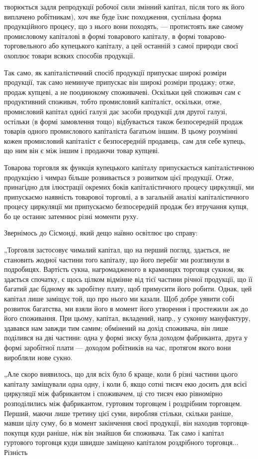 творюється задля репродукції робочої сили змінний капітал, після того як
його виплачено робітникам), хоч яке буде їхнє походження, суспільна
форма продукційного процесу, що з нього вони походять, — протистоять
вже самому промисловому капіталові в формі товарового капіталу, в формі
товарово-торговельного або купецького капіталу, а цей останній з самої
природи своєї охоплює товари всяких способів продукції.

Так само, як капіталістичний спосіб продукції припускає широкі розміри
продукції, так само неминуче припускає він широкі розміри продажу;
отже, продаж купцеві, а не поодинокому споживачеві. Оскільки цей
споживач сам є продуктивний споживач, тобто промисловий капіталіст,
оскільки, отже, промисловий капітал однієї галузі дає засоби продукції
для другої галузі, остільки (в формі замовлення тощо) відбувається
також безпосередній продаж товарів одного промислового капіталіста
багатьом іншим. В цьому розумінні кожен промисловий капіталіст є безпосередній
продавець, сам для себе купець, що ним він є між іншим і
продаючи товар купцеві.

Товарова торговля як функція купецького капіталу припускається
капіталістичною продукцією і чимраз більше розвивається з розвитком
цієї продукції. Отже, принагідно для ілюстрації окремих боків капіталістичного
процесу циркуляції, ми припускаємо наявність товарової торговлі,
а в загальній аналізі капіталістичного процесу циркуляції ми
припускаємо безпосередній продаж без втручання купця, бо це останнє
затемнює різні моменти руху.

Звернімось до Сісмонді, який дещо наївно освітлює цю справу:

„Торговля застосовує чималий капітал, що на перший погляд,
здається, не становить жодної частини того капіталу, що його перебіг
ми розглянули в подробицях. Вартість сукна, нагромадженого в крамницях
торговця сукном, як здається спочатку, є щось цілком відмінне
від тієї частини річної продукції, що її багатий дає бідному як заробітну
плату, щоб примусити його робити. Однак, цей капітал лише заміщує
той, що про нього ми казали. Щоб добре уявити собі розвиток багатства,
ми взяли його в момент його утворення і простежили аж до його
споживання. При цьому, капітал, вкладений, напр., у суконну мануфактуру,
здавався нам завжди тим самим; обмінений на дохід споживача, він
лише поділився на дві частини: одна у формі зиску була доходом фабриканта,
друга у формі заробітної плати — доходом робітників на час,
протягом якого вони виробляли нове сукно.

„Але скоро виявилось, що для всіх було б краще, коли б різні частини
цього капіталу заміщували одна одну, і коли б, якщо сотні тисяч екю
досить для всієї циркуляції між фабрикантом і споживачем, ці сто тисяч
екю рівномірно розподілились між фабрикантом, гуртовим торговцем і
роздрібним торговцем. Перший, маючи лише третину цієї суми, виробляв
стільки, скільки раніше, мавши цілу суму, бо в момент закінчення
своєї продукції, він находив торговця-покупця куди раніше, ніж
він знайшов би споживача. Так само і капітал гуртового торговця
куди швидше заміщено капіталом роздрібного торговця... Різність

